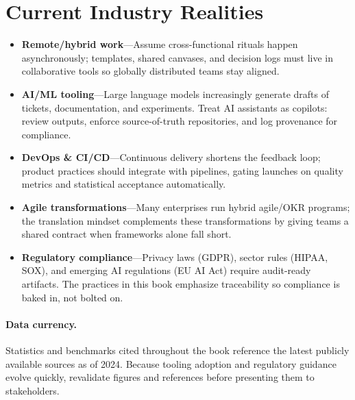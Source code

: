 \section{Current Industry Realities}
\label{sec:intro-reality}
\begin{itemize}
    \item \textbf{Remote/hybrid work}—Assume cross-functional rituals happen asynchronously; templates, shared canvases, and decision logs must live in collaborative tools so globally distributed teams stay aligned.
    \item \textbf{AI/ML tooling}—Large language models increasingly generate drafts of tickets, documentation, and experiments. Treat AI assistants as copilots: review outputs, enforce source-of-truth repositories, and log provenance for compliance.
    \item \textbf{DevOps \& CI/CD}—Continuous delivery shortens the feedback loop; product practices should integrate with pipelines, gating launches on quality metrics and statistical acceptance automatically.
    \item \textbf{Agile transformations}—Many enterprises run hybrid agile/OKR programs; the translation mindset complements these transformations by giving teams a shared contract when frameworks alone fall short.
    \item \textbf{Regulatory compliance}—Privacy laws (GDPR), sector rules (HIPAA, SOX), and emerging AI regulations (EU AI Act) require audit-ready artifacts. The practices in this book emphasize traceability so compliance is baked in, not bolted on.
\end{itemize}

\paragraph{Data currency.} Statistics and benchmarks cited throughout the book reference the latest publicly available sources as of 2024. Because tooling adoption and regulatory guidance evolve quickly, revalidate figures and references before presenting them to stakeholders.
